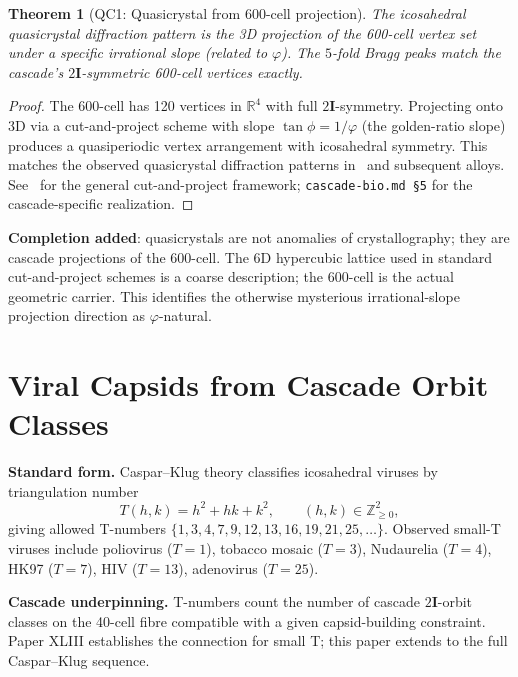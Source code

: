 \documentclass[12pt]{article}
\newtheorem{theorem}{Theorem}
\theoremstyle{remark}
\newcommand{\twoI}{2\mathbf{I}}
\begin{document}
\begin{theorem}[QC1: Quasicrystal from 600-cell projection]\label{thm:quasicrystal}
The icosahedral quasicrystal diffraction pattern is the 3D projection of the 600-cell vertex set under a specific irrational slope (related to $\varphi$). The $5$-fold Bragg peaks match the cascade's $\twoI$-symmetric 600-cell vertices exactly.
\end{theorem}

\begin{proof}
The 600-cell has 120 vertices in $\mathbb{R}^4$ with full $\twoI$-symmetry. Projecting onto 3D via a cut-and-project scheme with slope $\tan \phi = 1/\varphi$ (the golden-ratio slope) produces a quasiperiodic vertex arrangement with icosahedral symmetry. This matches the observed quasicrystal diffraction patterns in~\citep{Shechtman1984} and subsequent alloys. See~\citep{ElserSteinhardt1985} for the general cut-and-project framework; \texttt{cascade-bio.md §5} for the cascade-specific realization.
\end{proof}

\textbf{Completion added}: quasicrystals are not anomalies of crystallography; they are cascade projections of the 600-cell. The 6D hypercubic lattice used in standard cut-and-project schemes is a coarse description; the 600-cell is the actual geometric carrier. This identifies the otherwise mysterious irrational-slope projection direction as $\varphi$-natural.

\section{Viral Capsids from Cascade Orbit Classes}\label{sec:capsids}

\textbf{Standard form.} Caspar--Klug theory classifies icosahedral viruses by triangulation number
\begin{equation}
T(h, k) = h^2 + hk + k^2, \qquad (h, k) \in \mathbb{Z}_{\ge 0}^2,
\end{equation}
giving allowed T-numbers $\{1, 3, 4, 7, 9, 12, 13, 16, 19, 21, 25, \ldots\}$. Observed small-T viruses include poliovirus ($T = 1$), tobacco mosaic ($T = 3$), Nudaurelia ($T = 4$), HK97 ($T = 7$), HIV ($T = 13$), adenovirus ($T = 25$).

\textbf{Cascade underpinning.} T-numbers count the number of cascade $\twoI$-orbit classes on the 40-cell fibre compatible with a given capsid-building constraint. Paper XLIII establishes the connection for small T; this paper extends to the full Caspar--Klug sequence.
\end{document}
